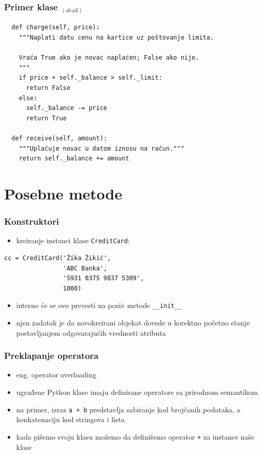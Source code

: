 \documentclass[compress]{beamer}
\begin{document}
\begin{frame}[fragile,shrink=10]
  \frametitle{Primer klase $_{(deo 3)}$}
\begin{verbatim}
  def charge(self, price):
    """Naplati datu cenu na kartice uz poštovanje limita.
    
    Vraća True ako je novac naplaćen; False ako nije.
    """
    if price + self._balance > self._limit:
      return False
    else:
      self._balance -= price
      return True

  def receive(self, amount):
    """Uplaćuje novac u datom iznosu na račun."""
    return self._balance += amount

\end{verbatim}
\end{frame}

\section[Posebne metode]{Posebne metode}
\begin{frame}[fragile]
  \frametitle{Konstruktori}
  \begin{itemize}
    \item kreiranje instanci klase \texttt{CreditCard}: 
  \end{itemize}
\begin{verbatim}
cc = CreditCard('Žika Žikić', 
                'ABC Banka', 
                '5931 0375 9837 5309', 
                1000)
\end{verbatim}
  \begin{itemize}
    \item interno će se ovo prevesti na poziv metode \texttt{\_\_init\_\_}
    \item njen zadatak je da novokreirani objekat dovede u korektno početno stanje postavljanjem odgovarajućih vrednosti atributa
  \end{itemize}
\end{frame}

\begin{frame}[fragile]
  \frametitle{Preklapanje operatora}
  \begin{itemize}
    \item eng. operator overloading
    \item ugrađene Python klase imaju definisane operatore sa prirodnom semantikom
    \item na primer, izraz \texttt{a + b} predstavlja sabiranje kod brojčanih podataka, a konkatenaciju kod stringova i lista
    \item kada pišemo svoju klasu možemo da definišemo operator \texttt{+} za instance naše klase   
  \end{itemize}
\end{frame}
\end{document}
